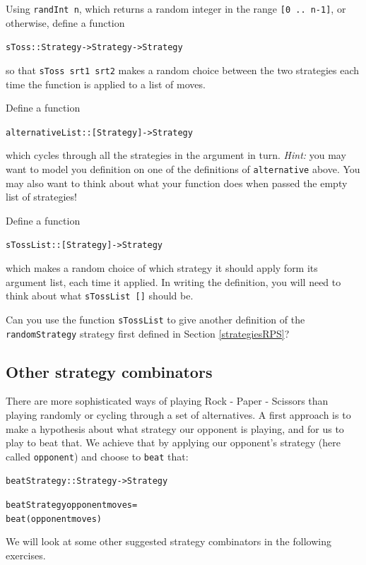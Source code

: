 \begin{exercises}

\item
Using \texttt{randInt n}, which returns a random integer in the range \texttt{[0 .. n-1]}, or otherwise, define a function
\begin{alltt}
sToss :: Strategy -> Strategy -> Strategy
\end{alltt}
so that \texttt{sToss srt1 srt2} makes a random choice between the two strategies each time the function is applied to a list of moves.

\item
Define a function 
\begin{alltt}
alternativeList :: [Strategy] -> Strategy
\end{alltt}
which cycles through all the strategies in the argument in turn. \emph{Hint:} you may want to model you definition on one of the definitions of \texttt{alternative} above.
You may also want to think about what your function does when passed the empty list of strategies!

\item
Define a function 
\begin{alltt}
sTossList :: [Strategy] -> Strategy
\end{alltt}
which makes a random choice of which strategy it should apply form its argument list, each time it applied. In writing the definition, you will need to think about what \texttt{sTossList []} should be.

\item 
Can you use the function \texttt{sTossList} to give another definition of the \texttt{randomStrategy} strategy first defined in Section \ref{strategiesRPS}?

\end{exercises}

\subsection*{Other strategy combinators}

There are more sophisticated ways of playing Rock - Paper - Scissors than playing randomly or cycling through a set of alternatives. A first approach is to make a hypothesis about what strategy our opponent is playing, and for us to play to beat that. We achieve that by applying our opponent's strategy (here called \texttt{opponent}) and choose to \texttt{beat} that:
\begin{alltt}
beatStrategy :: Strategy -> Strategy

beatStrategy opponent moves =
    beat (opponent moves)
\end{alltt} 
We will look at some other suggested strategy combinators in the following exercises.

